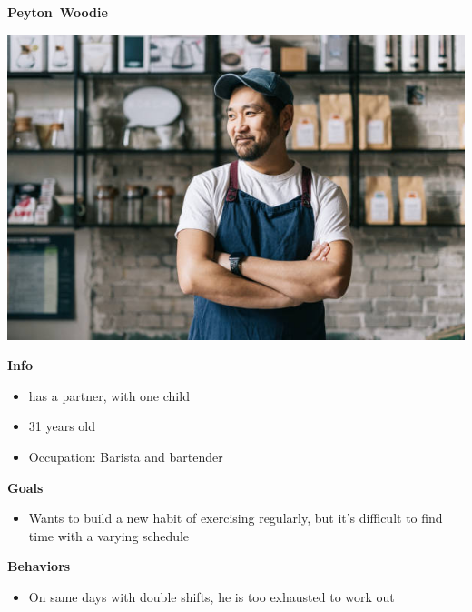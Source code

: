 \textbf{Peyton~Woodie}

\includegraphics{../common/personas/res/Peyton.jpg}

\textbf{Info}
\begin{itemize}
  \item has a partner, with one child
  \item 31 years old
  \item Occupation: Barista and bartender
\end{itemize}

\textbf{Goals}
\begin{itemize}
  \item Wants to build a new habit of exercising regularly, but it's difficult to find time with a varying schedule
\end{itemize}

\textbf{Behaviors}
\begin{itemize}
  \item On same days with double shifts, he is too exhausted to work out
\end{itemize}
